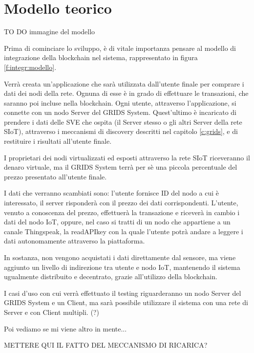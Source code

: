 \section{Modello teorico}
\label{c:integr:model}

TO DO immagine del modello

Prima di cominciare lo sviluppo, è di vitale importanza pensare al modello di integrazione della blockchain nel sistema, rappresentato in figura \ref{f:integr:modello}. 

Verrà creata un'applicazione che sarà utilizzata dall'utente finale per comprare i dati dei nodi della rete. 
Ognuna di esse è in grado di effettuare le transazioni, che saranno poi incluse nella blockchain. Ogni utente, attraverso l'applicazione, si connette con un nodo Server del GRIDS System. Quest'ultimo è incaricato di prendere i dati delle SVE che ospita (il Server stesso o gli altri Server della rete SIoT), attraverso i meccanismi di discovery descritti nel capitolo \ref{c:grids}, e di restituire i risultati all'utente finale. 

I proprietari dei nodi virtualizzati ed esposti attraverso la rete SIoT riceveranno il denaro virtuale, ma il GRIDS System terrà per sè una piccola percentuale del prezzo presentato all'utente finale.

I dati che verranno scambiati sono: l'utente fornisce ID del nodo a cui è interessato, il server risponderà con il prezzo dei dati corrispondenti. L'utente, venuto a conoscenza del prezzo, effettuerà la transazione e riceverà in cambio i dati del nodo IoT, oppure, nel caso si tratti di un nodo che appartiene a un canale Thingspeak, la readAPIkey con la quale l'utente potrà andare a leggere i dati autonomamente attraverso la piattaforma.

In sostanza, non vengono acquistati i dati direttamente dal sensore, ma viene aggiunto un livello di indirezione tra utente e nodo IoT, mantenendo il sistema ugualmente distribuito e decentrato, grazie all'utilizzo della blockchain.

I casi d'uso con cui verrà effettuato il testing riguarderanno un nodo Server del GRIDS System e un Client, ma sarà possibile utilizzare il sistema con una rete di Server e con Client multipli. (?)

Poi vediamo se mi viene altro in mente...

METTERE QUI IL FATTO DEL MECCANISMO DI RICARICA?


